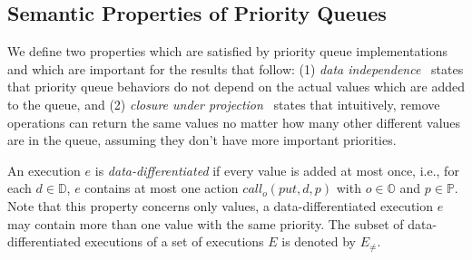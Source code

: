 
\subsection{Semantic Properties of Priority Queues}\label{ssec:semantic_prop}

We define two properties which are satisfied by priority queue implementations and which are important for the results that follow: (1) \emph{data independence}~\cite{conf/popl/Wolper86,conf/tacas/AbdullaHHJR13} states that priority queue behaviors do not depend on the actual values which are added to the queue, and (2) \emph{closure under projection}~\cite{DBLP:conf/icalp/BouajjaniEEH15} states that intuitively, remove operations can return the same values no matter how many other different values are in the queue, assuming they don't have more important priorities.

An execution $e$ is \emph{data-differentiated} if every value is added at most once, i.e., for each $d \in \mathbb{D}$, $e$ contains at most one action $\textit{call}_o(\textit{put},d,p)$ with $o\in\mathbb{O}$ and $p\in \mathbb{P}$. Note that this property concerns only values, a data-differentiated execution $e$ may contain more than one value with the same priority. The subset of data-differentiated executions of a set of executions $E$ is denoted by $E_{\neq}$.

